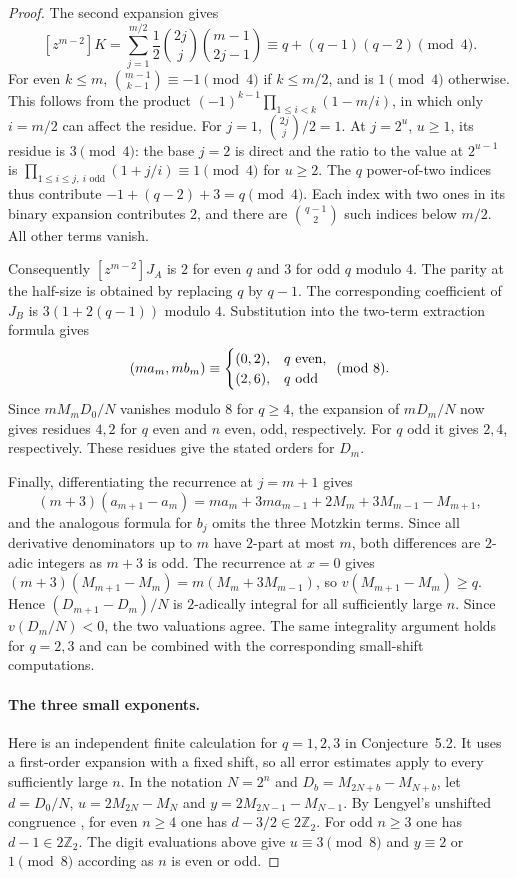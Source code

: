 \documentclass[11pt,a4paper]{article}
\begin{document}
\begin{proof}
The second expansion gives
\[
 [z^{m-2}]K=\sum_{j=1}^{m/2}\frac12\binom{2j}{j}\binom{m-1}{2j-1}
 \equiv q+(q-1)(q-2)\pmod4.
\]
For even $k\le m$, $\binom{m-1}{k-1}\equiv-1\pmod4$ if $k\le m/2$, and is $1\pmod4$ otherwise. This follows from the product $(-1)^{k-1}\prod_{1\le i<k}(1-m/i)$, in which only $i=m/2$ can affect the residue. For $j=1$, $\binom{2j}{j}/2=1$. At $j=2^u$, $u\ge1$, its residue is $3\pmod4$: the base $j=2$ is direct and the ratio to the value at $2^{u-1}$ is $\prod_{1\le i\le j,\ i\text{ odd}}(1+j/i)\equiv1\pmod4$ for $u\ge2$. The $q$ power-of-two indices thus contribute $-1+(q-2)+3=q\pmod4$. Each index with two ones in its binary expansion contributes $2$, and there are $\binom{q-1}{2}$ such indices below $m/2$. All other terms vanish.

Consequently $[z^{m-2}]J_A$ is $2$ for even $q$ and $3$ for odd $q$ modulo $4$. The parity at the half-size is obtained by replacing $q$ by $q-1$. The corresponding coefficient of $J_B$ is $3(1+2(q-1))$ modulo $4$. Substitution into the two-term extraction formula gives
\[
  (m a_m,m b_m)\equiv
 \begin{cases}
 (0,2),&q\ {\rm even},\\
 (2,6),&q\ {\rm odd}
 \end{cases}\pmod8.
\]
Since $mM_mD_0/N$ vanishes modulo $8$ for $q\ge4$, the expansion of $mD_m/N$ now gives residues $4,2$ for $q$ even and $n$ even, odd, respectively. For $q$ odd it gives $2,4$, respectively. These residues give the stated orders for $D_m$.

Finally, differentiating the recurrence at $j=m+1$ gives
\[
 (m+3)(a_{m+1}-a_m)=m a_m+3m a_{m-1}+2M_m+3M_{m-1}-M_{m+1},
\]
and the analogous formula for $b_j$ omits the three Motzkin terms. Since all derivative denominators up to $m$ have $2$-part at most $m$, both differences are $2$-adic integers as $m+3$ is odd. The recurrence at $x=0$ gives $(m+3)(M_{m+1}-M_m)=m(M_m+3M_{m-1})$, so $v(M_{m+1}-M_m)\ge q$. Hence $(D_{m+1}-D_m)/N$ is $2$-adically integral for all sufficiently large $n$. Since $v(D_m/N)<0$, the two valuations agree. The same integrality argument holds for $q=2,3$ and can be combined with the corresponding small-shift computations.
\paragraph{The three small exponents.}
Here is an independent finite calculation for $q=1,2,3$ in Conjecture~5.2.
It uses a first-order expansion with a fixed shift, so all error estimates
apply to every sufficiently large $n$. In the notation $N=2^n$ and
$D_b=M_{2N+b}-M_{N+b}$, let $d=D_0/N$, $u=2M_{2N}-M_N$ and
$y=2M_{2N-1}-M_{N-1}$. By Lengyel's unshifted congruence
\cite[Theorem~5.6]{lengyel13}, for even $n\ge4$ one has
$d-3/2\in2\mathbb Z_2$. For odd $n\ge3$ one has
$d-1\in2\mathbb Z_2$. The digit evaluations above give $u\equiv3\pmod8$ and
$y\equiv 2$ or $1\pmod8$ according as $n$ is even or odd.


\end{proof}
\end{document}

